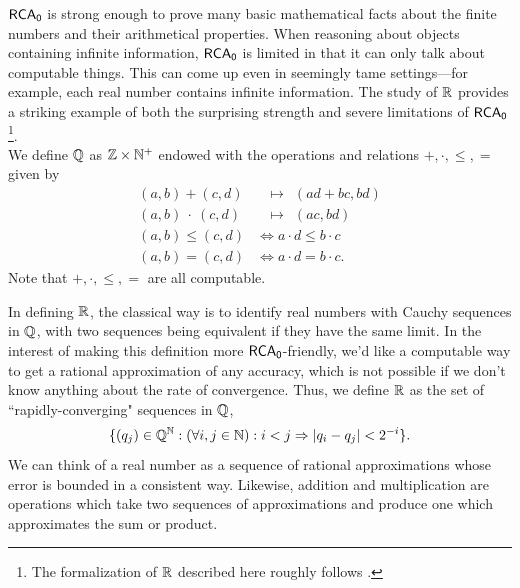 \documentclass{amsart}
\begin{document}
	
	$\operatorname{\sf{RCA_0}}$ is strong enough to prove many basic mathematical facts about the finite numbers and their arithmetical properties. When reasoning about objects containing infinite information, $\operatorname{\sf{RCA_0}}$ is limited in that it can only talk about computable things. This can come up even in seemingly tame settings---for example, each real number contains infinite information. The study of $\mathbb{R}$ provides a striking example of both the surprising strength and severe limitations of $\operatorname{\sf{RCA_0}}$\footnote{The formalization of $\mathbb{R}$ described here roughly follows \cite{simpson}.}.\\
	
	We define $\mathbb{Q}$ as $\mathbb{Z}\times \mathbb{N}^+$ endowed with the operations and relations $+,\cdot,\leq ,=$ given by
	\begin{align*}
		(a,b) + (c,d) &\;\;\,\mapsto\;\, (ad+bc,bd)\\
		(a,b) \: \cdot \: (c,d) &\;\;\,\mapsto \;\,(ac,bd)\\
		(a,b) \leq (c,d) &\iff a\cdot d \leq b\cdot c\\
		(a,b) = (c,d) &\iff a\cdot d = b\cdot c.
	\end{align*}
	Note that $+,\cdot,\leq,=$ are all computable.
	
	In defining $\mathbb{R}$, the classical way is to identify real numbers with Cauchy sequences in $\mathbb{Q}$, with two sequences being equivalent if they have the same limit. In the interest of making this definition more $\operatorname{\sf{RCA_0}}$-friendly, we'd like a computable way to get a rational approximation of any accuracy, which is not possible if we don't know anything about the rate of convergence. Thus, we define $\mathbb{R}$ as the set of ``rapidly-converging" sequences in $\mathbb{Q}$,
	$$
	\{(q_j) \in \mathbb{Q}^{\mathbb{N}} : (\forall i,j\in \mathbb{N}): i<j \Rightarrow |q_i-q_j|<2^{-i}\}.
	$$
	We can think of a real number as a sequence of rational approximations whose error is bounded in a consistent way. Likewise, addition and multiplication are operations which take two sequences of approximations and produce one which approximates the sum or product.
	
\end{document}
